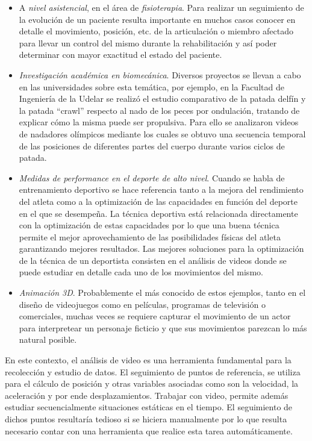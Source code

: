 \begin{itemize}
\item A \emph{nivel asistencial}, en el área de \emph{fisioterapia}. Para realizar un seguimiento de la evolución de un paciente resulta importante en muchos casos conocer en detalle el movimiento, posición, etc. de la articulación o miembro afectado para llevar un control del mismo durante la rehabilitación y así poder determinar con mayor exactitud el estado del paciente.
\item \emph{Investigación académica en biomecánica}. Diversos proyectos se llevan a cabo en las universidades sobre esta temática, por ejemplo, en la Facultad de Ingeniería de la Udelar  se realizó el estudio comparativo de la patada delfín y la patada “crawl” respecto al nado de los peces por ondulación, tratando de explicar cómo la misma puede ser propulsiva. Para ello se analizaron videos de nadadores olímpicos mediante los cuales se obtuvo una secuencia temporal de las posiciones de diferentes partes del cuerpo durante varios ciclos de patada.
\item \emph{Medidas de performance en el deporte de alto nivel}. Cuando se habla de entrenamiento deportivo se hace referencia tanto a la mejora del rendimiento del atleta como a la optimización de las capacidades en función del deporte en el que se desempeña. La técnica deportiva está relacionada directamente con la optimización de estas capacidades por lo que una buena técnica permite el mejor aprovechamiento de las posibilidades físicas del atleta garantizando mejores resultados. Las mejores soluciones para la optimización de la técnica de un deportista consisten en el análisis de videos donde se puede estudiar en detalle cada uno de los movimientos del  mismo.
\item \emph{Animación 3D}. Probablemente el más conocido de estos ejemplos, tanto en el diseño de videojuegos como en películas, programas de televisión o comerciales, muchas veces se requiere capturar el movimiento de un actor para interpretear un personaje ficticio y que sus movimientos parezcan lo más natural posible.
\end{itemize}

En este contexto, el análisis de video  es  una  herramienta  fundamental para la recolección y estudio de datos. El seguimiento de puntos de referencia, se utiliza para el cálculo de posición y otras variables asociadas como son la velocidad, la aceleración y por ende desplazamientos. Trabajar con video, permite además estudiar secuencialmente situaciones estáticas en el tiempo. El seguimiento de dichos puntos resultaría tedioso si se hiciera manualmente por lo que resulta necesario contar con una herramienta que realice esta tarea automáticamente.

